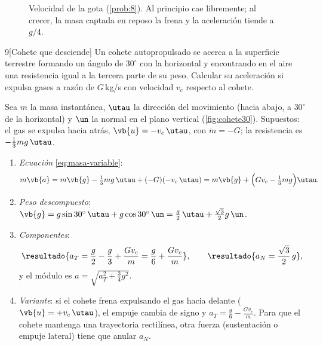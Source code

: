 \begin{figure}[ht]
\centering
{}
\caption{Velocidad de la gota (\cref{prob:8}). Al principio cae libremente; al
crecer, la masa captada en reposo la frena y la aceleración tiende a $g/4$.}
\label{fig:gota}
\end{figure}

\begin{problema}{9}[Cohete que desciende]
\label{prob:9}
Un cohete autopropulsado se acerca a la superficie terrestre formando un
ángulo de $30^{\circ}$ con la horizontal y encontrando en el aire una resistencia
igual a la tercera parte de su peso. Calcular su aceleración si expulsa gases
a razón de $G$\,kg/s con velocidad $v_{c}$ respecto al cohete.
\end{problema}

\begin{resolucion}
Sea $m$ la masa instantánea, $\utau$ la dirección del movimiento (hacia abajo,
a $30^{\circ}$ de la horizontal) y $\un$ la normal en el plano vertical
(\cref{fig:cohete30}). Supuestos: el gas se expulsa hacia atrás,
$\vb{u}=-v_{c}\,\utau$, con $\dot m=-G$; la resistencia es $-\tfrac13mg\,\utau$.
\begin{enumerate}
  \item \emph{Ecuación} \eqref{eq:masa-variable}:
  \[
    m\vb{a}=m\vb{g}-\tfrac13mg\,\utau+(-G)(-v_{c}\,\utau)
    =m\vb{g}+\Bigl(Gv_{c}-\tfrac13mg\Bigr)\utau .
  \]
  \item \emph{Peso descompuesto}: $\vb{g}=g\sin30^{\circ}\,\utau+g\cos30^{\circ}\,\un=\tfrac g2\,\utau+\tfrac{\sqrt3}{2}g\,\un$.
  \item \emph{Componentes}:
  \[
    \resultado{a_{T}=\frac g2-\frac g3+\frac{Gv_{c}}{m}=\frac g6+\frac{Gv_{c}}{m}},\qquad
    \resultado{a_{N}=\frac{\sqrt3}{2}\,g},
  \]
  y el módulo es $a=\sqrt{a_{T}^{2}+\tfrac34g^{2}}$.
  \item \emph{Variante}: si el cohete frena expulsando el gas hacia delante
  ($\vb{u}=+v_{c}\,\utau$), el empuje cambia de signo y $a_{T}=\tfrac g6-\tfrac{Gv_{c}}{m}$. Para
  que el cohete mantenga una trayectoria rectilínea, otra fuerza (sustentación
  o empuje lateral) tiene que anular $a_{N}$.\qedhere
\end{enumerate}
\end{resolucion}

